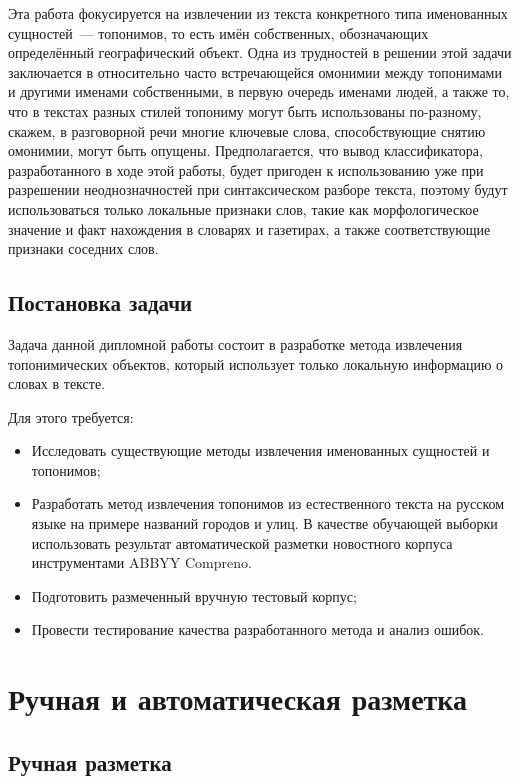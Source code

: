 \documentclass[14pt,russian]{extreport}
\begin{document}
Эта работа фокусируется на извлечении из текста конкретного типа именованных
сущностей~--- топонимов, то есть имён собственных, обозначающих определённый
географический объект. Одна из трудностей в решении этой задачи заключается в
относительно часто встречающейся омонимии между топонимами и другими именами
собственными, в первую очередь именами людей, а также то, что в текстах разных
стилей топониму могут быть использованы по-разному, скажем, в разговорной речи
многие ключевые слова, способствующие снятию омонимии, могут быть опущены.
Предполагается, что вывод классификатора, разработанного в ходе этой работы,
будет пригоден к использованию уже при разрешении неоднозначностей при
синтаксическом разборе текста, поэтому будут использоваться только локальные
признаки слов, такие как морфологическое значение и факт нахождения в словарях
и газетирах, а также соответствующие признаки соседних слов.

\section{Постановка задачи}

Задача данной дипломной работы состоит в разработке метода извлечения
топонимических объектов, который использует только локальную информацию о
словах в тексте.

Для этого требуется:
\begin{itemize}
  \item Исследовать существующие методы извлечения именованных сущностей и
    топонимов;

  \item Разработать метод извлечения топонимов из естественного текста на
    русском языке на примере названий городов и улиц. В качестве обучающей
    выборки использовать результат автоматической разметки новостного корпуса
    инструментами ABBYY Compreno.

  \item Подготовить размеченный вручную тестовый корпус;

  \item Провести тестирование качества разработанного метода и анализ ошибок.
\end{itemize}

\chapter{Ручная и автоматическая разметка}

\section{Ручная разметка}
\end{document}
